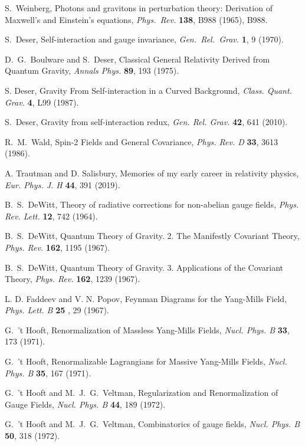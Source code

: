 \documentclass{ws-procs961x669}            %
\begin{document}
\begin{thebibliography}{10}
S.~Weinberg, Photons and gravitons in perturbation theory: Derivation of Maxwell's and Einstein's equations,
{\em Phys.\ Rev.} {\bf 138}, B988 (1965), B988.

S.~Deser, Self-interaction and gauge invariance, {\em Gen.\ Rel.\ Grav.} {\bf 1}, 9 (1970).

D.~G.~Boulware and S.~Deser, Classical General Relativity Derived from Quantum Gravity, {\em Annals Phys.} {\bf 89}, 193 (1975).

S. Deser, Gravity From Self-interaction in a Curved Background, {\em  Class. Quant. Grav.} {\bf4}, L99 (1987).

S.~Deser, Gravity from self-interaction redux, {\em Gen. Rel. Grav.} {\bf42}, 641 (2010).

R.~M.~Wald, Spin-2 Fields and General Covariance, {\em Phys. Rev. D} {\bf33}, 3613 (1986).

A. Trautman and D. Salisbury, Memories of my early career in relativity physics, {\em Eur. Phys. J. H} {\bf 44}, 391 (2019).

B.~S.~DeWitt, Theory of radiative corrections for non-abelian gauge fields, {\em Phys. Rev. Lett. } {\bf 12}, 742 (1964).

B.~S.~DeWitt, Quantum Theory of Gravity. 2. The Manifestly Covariant Theory, {\em Phys. Rev. } {\bf 162}, 1195 (1967).

B.~S.~DeWitt, Quantum Theory of Gravity. 3. Applications of the Covariant Theory, {\em Phys. Rev. } {\bf 162}, 1239 (1967).

L. D. Faddeev and V. N. Popov, Feynman Diagrams for the Yang-Mills Field, {\em Phys. Lett. B } {\bf 25} , 29 (1967).

G.~'t Hooft, Renormalization of Massless Yang-Mills Fields, {\em Nucl. Phys. B } {\bf 33}, 173 (1971).

G.~'t Hooft, Renormalizable Lagrangians for Massive Yang-Mills Fields,
{\em Nucl. Phys. B } {\bf 35}, 167 (1971).

G.~'t Hooft and M.~J.~G.~Veltman, Regularization and Renormalization of Gauge Fields, {\em Nucl. Phys. B } {\bf 44}, 189 (1972).

G.~'t Hooft and M.~J.~G.~Veltman, Combinatorics of gauge fields, {\em Nucl. Phys. B } {\bf 50}, 318 (1972).


\end{thebibliography}
\end{document}
